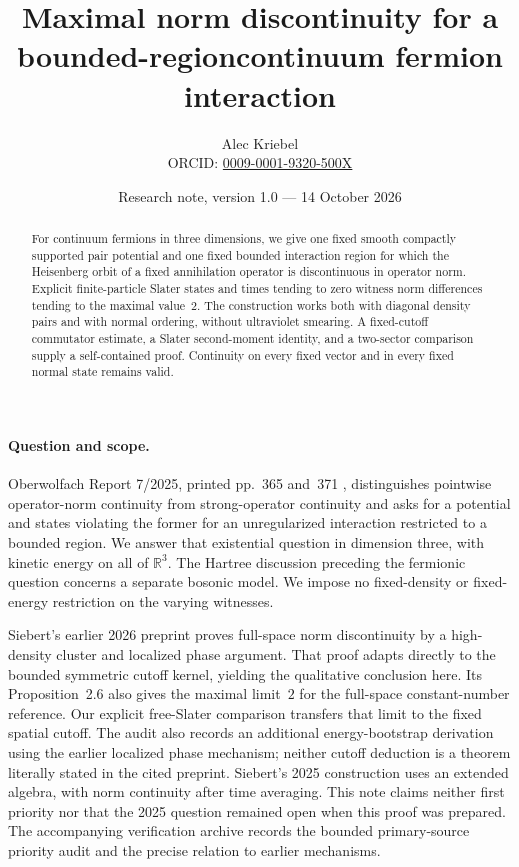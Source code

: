 \documentclass[11pt]{article}
\title{Maximal norm discontinuity for a bounded-region\newline continuum fermion interaction}
\author{Alec Kriebel\\\small ORCID: \href{https://orcid.org/0009-0001-9320-500X}{0009-0001-9320-500X}}
\date{Research note, version 1.0 --- 14 October 2026}
\begin{document}
\maketitle
\begin{abstract}
For continuum fermions in three dimensions, we give one fixed smooth compactly
supported pair potential and one fixed bounded interaction region for which
the Heisenberg orbit of a fixed annihilation operator is discontinuous in
operator norm. Explicit finite-particle Slater states and times tending to zero
witness norm differences tending to the maximal value~$2$. The construction
works both with diagonal density pairs and with normal ordering, without
ultraviolet smearing. A fixed-cutoff commutator estimate, a Slater second-moment
identity, and a two-sector comparison supply a self-contained proof. Continuity
on every fixed vector and in every fixed normal state remains valid.
\end{abstract}

\paragraph{Question and scope.}
Oberwolfach Report 7/2025, printed pp.~365 and~371 \cite{OWR}, distinguishes
pointwise operator-norm continuity from strong-operator continuity and asks
for a potential and states violating the former for an unregularized
interaction restricted to a bounded region. We answer that existential
question in dimension three, with kinetic energy on all of $\mathbb R^3$.
The Hartree discussion preceding the fermionic question concerns a separate
bosonic model. We impose no fixed-density or fixed-energy restriction on the
varying witnesses.

Siebert's earlier 2026 preprint \cite{Discontinuity} proves full-space norm
discontinuity by a high-density cluster and localized phase argument. That
proof adapts directly to the bounded symmetric cutoff kernel, yielding the
qualitative conclusion here. Its Proposition~2.6 also gives the maximal limit~$2$
for the full-space constant-number reference. Our explicit free-Slater
comparison transfers that limit to the fixed spatial cutoff. The audit also
records an additional energy-bootstrap derivation using the earlier localized
phase mechanism; neither cutoff deduction is a theorem literally stated in
the cited preprint. Siebert's 2025 construction \cite{Thermodynamic} uses an
extended algebra, with norm continuity after time averaging. This note claims neither
first priority nor that the 2025 question remained open when this proof was
prepared. The accompanying verification archive records the bounded
primary-source priority audit and the precise relation to earlier mechanisms.
\end{document}

